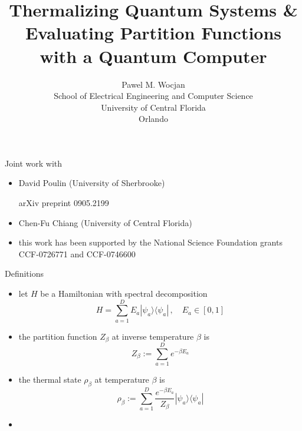 \documentclass[slideColor]{prosper}
\title{Thermalizing Quantum Systems \&\\ Evaluating Partition Functions\\ with a Quantum Computer}
\author{Pawel M. Wocjan\\[1ex]School of Electrical Engineering and Computer Science\\ University of Central Florida\\Orlando}
\renewcommand{\>}{\rangle}
\newcommand{\<}{\langle}
\begin{document}
\maketitle

\begin{slide}{Joint work with}
\begin{itemize}
\item David Poulin (University of Sherbrooke) 

\medskip
arXiv preprint 0905.2199

\bigskip

\item Chen-Fu Chiang (University of Central Florida)

\bigskip\bigskip
\item this work has been supported by the National Science Foundation
grants CCF-0726771 and CCF-0746600
\end{itemize}
\end{slide}


\begin{slide}{Definitions}
\begin{itemize}
\vspace{-0.25cm}
\item let $H$ be a Hamiltonian with spectral decomposition
\[
H = \sum_{a=1}^D E_a |\psi_a\>\<\psi_a|\,, \quad E_a \in [0,1]
\]

\item the partition function $Z_\beta$ at inverse temperature $\beta$ is
\[
Z_\beta := \sum_{a=1}^D e^{-\beta E_a}
\]

\item the thermal state $\rho_\beta$ at temperature $\beta$ is
\[
\rho_\beta := \sum_{a=1}^D \frac{e^{-\beta E_a}}{Z_\beta} |\psi_a\>\<\psi_a|
\]

\medskip
\item 
\end{itemize}

\end{slide}

\end{document}
